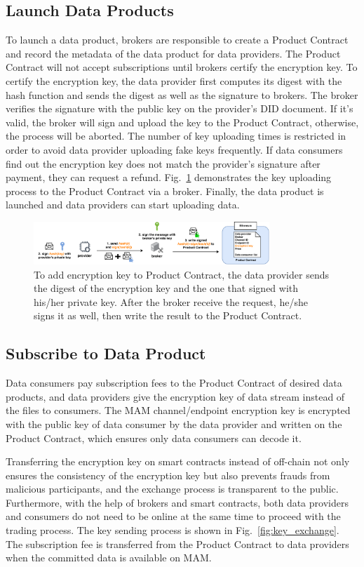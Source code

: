 \documentclass[10pt, conference, compsocconf]{IEEEtran}
\begin{document}
\subsection{Launch Data Products}
To launch a data product, brokers are responsible to create a Product Contract and record the metadata of the data product for data providers. The Product Contract will not accept subscriptions until brokers certify the encryption key. To certify the encryption key, the data provider first computes its digest with the hash function and sends the digest as well as the signature to brokers. The broker verifies the signature with the public key on the provider's DID document. If it's valid, the broker will sign and upload the key to the Product Contract, otherwise, the process will be aborted. The number of key uploading times is restricted in order to avoid data provider uploading fake keys frequently. If data consumers find out the encryption key does not match the provider's signature after payment, they can request a refund. Fig.~\ref{fig:key_upload} demonstrates the key uploading process to the Product Contract via a broker. Finally, the data product is launched and data providers can start uploading data.
\begin{figure}[h]
    \centering
    \includegraphics[width=3.5in]{key_upload}
    \caption{To add encryption key to Product Contract, the data provider sends the digest of the encryption key and the one that signed with his/her private key. After the broker receive the request, he/she signs it as well, then write the result to the Product Contract.}
    \label{fig:key_upload}
\end{figure}

\subsection{Subscribe to Data Product}
Data consumers pay subscription fees to the Product Contract of desired data products, and data providers give the encryption key of data stream instead of the files to consumers. The MAM channel/endpoint encryption key is encrypted with the public key of data consumer by the data provider and written on the Product Contract, which ensures only data consumers can decode it.

Transferring the encryption key on smart contracts instead of off-chain not only ensures the consistency of the encryption key but also prevents frauds from malicious participants, and the exchange process is transparent to the public. Furthermore, with the help of brokers and smart contracts, both data providers and consumers do not need to be online at the same time to proceed with the trading process. The key sending process is shown in Fig.~\ref{fig:key_exchange}. The subscription fee is transferred from the Product Contract to data providers when the committed data is available on MAM.
\end{document}
